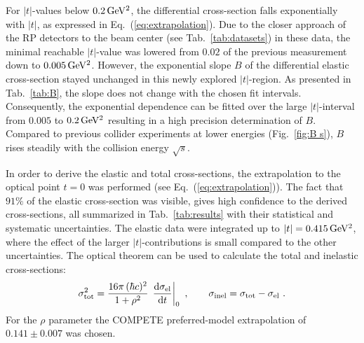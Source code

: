 \documentclass[doublecol]{epl/epl2}
\def\d{{\rm d}}
\def\un#1{\,{\rm #1}}
\begin{document}
For $|t|$-values below $0.2\un{GeV^2}$, the differential cross-section falls exponentially with $|t|$, as expressed in Eq.~(\ref{eq:extrapolation}). Due to the closer approach of the RP detectors to the beam center (see Tab.~\ref{tab:datasets}) in these data, the minimal reachable $|t|$-value was lowered from $0.02$ of the previous measurement \cite{epl96} down to $0.005\un{GeV^2}$. However, the exponential slope $B$ of the differential elastic cross-section stayed unchanged in this newly explored $|t|$-region. As presented in Tab.~\ref{tab:B}, the slope does not change with the chosen fit intervals. Consequently, the exponential dependence can be fitted over the large $|t|$-interval from $0.005$ to $0.2\un{GeV^2}$ resulting in a high precision determination of $B$. Compared to previous collider experiments at lower energies (Fig.~\ref{fig:B s}), $B$ rises steadily with the collision energy $\sqrt s$.

In order to derive the elastic and total cross-sections, the extrapolation to the optical point $t=0$ was performed (see Eq.~(\ref{eq:extrapolation})). The fact that $91\%$ of the elastic cross-section was visible, gives high confidence to the derived cross-sections, all summarized in Tab.~\ref{tab:results} with their statistical and systematic uncertainties. The elastic data were integrated up to $|t| = 0.415\un{GeV^2}$, where the effect of the larger $|t|$-contributions is small compared to the other uncertainties. The optical theorem can be used to calculate the total and inelastic cross-sections:
\begin{equation}
\label{eq:si tot}
\sigma_{\rm tot}^2 = {16\pi\, (\hbar c)^2\over 1 + \rho^2}\, \left. \d\sigma_{\rm el}\over\d t\right|_0\ ,\qquad
\sigma_{\rm inel} = \sigma_{\rm tot} - \sigma_{\rm el}\ .
\end{equation}
For the $\rho$ parameter the COMPETE \cite{compete} preferred-model extrapolation of $0.141\pm 0.007$ was chosen.





\end{document}
